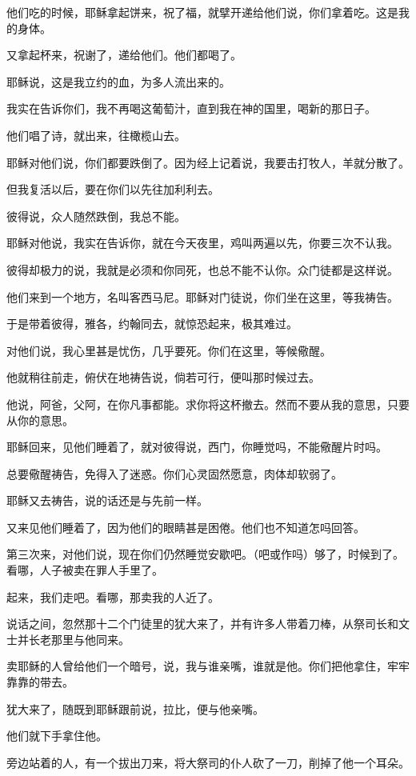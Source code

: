 \documentclass[12pt,oneside]{book}
\begin{document}
他们吃的时候，耶稣拿起饼来，祝了福，就擘开递给他们说，你们拿着吃。这是我的身体。

又拿起杯来，祝谢了，递给他们。他们都喝了。

耶稣说，这是我立约的血，为多人流出来的。

我实在告诉你们，我不再喝这葡萄汁，直到我在神的国里，喝新的那日子。

他们唱了诗，就出来，往橄榄山去。

耶稣对他们说，你们都要跌倒了。因为经上记着说，我要击打牧人，羊就分散了。

但我复活以后，要在你们以先往加利利去。

彼得说，众人随然跌倒，我总不能。

耶稣对他说，我实在告诉你，就在今天夜里，鸡叫两遍以先，你要三次不认我。

彼得却极力的说，我就是必须和你同死，也总不能不认你。众门徒都是这样说。

他们来到一个地方，名叫客西马尼。耶稣对门徒说，你们坐在这里，等我祷告。

于是带着彼得，雅各，约翰同去，就惊恐起来，极其难过。

对他们说，我心里甚是忧伤，几乎要死。你们在这里，等候儆醒。

他就稍往前走，俯伏在地祷告说，倘若可行，便叫那时候过去。

他说，阿爸，父阿，在你凡事都能。求你将这杯撤去。然而不要从我的意思，只要从你的意思。

耶稣回来，见他们睡着了，就对彼得说，西门，你睡觉吗，不能儆醒片时吗。

总要儆醒祷告，免得入了迷惑。你们心灵固然愿意，肉体却软弱了。

耶稣又去祷告，说的话还是与先前一样。

又来见他们睡着了，因为他们的眼睛甚是困倦。他们也不知道怎吗回答。

第三次来，对他们说，现在你们仍然睡觉安歇吧。（吧或作吗）够了，时候到了。看哪，人子被卖在罪人手里了。

起来，我们走吧。看哪，那卖我的人近了。

说话之间，忽然那十二个门徒里的犹大来了，并有许多人带着刀棒，从祭司长和文士并长老那里与他同来。

卖耶稣的人曾给他们一个暗号，说，我与谁亲嘴，谁就是他。你们把他拿住，牢牢靠靠的带去。

犹大来了，随既到耶稣跟前说，拉比，便与他亲嘴。

他们就下手拿住他。

旁边站着的人，有一个拔出刀来，将大祭司的仆人砍了一刀，削掉了他一个耳朵。
\end{document}
